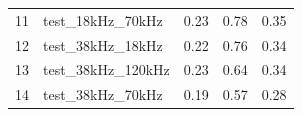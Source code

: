\begin{longtable}{lllll}
11                     & test\_18kHz\_70kHz                          & 0.23                           & 0.78                        & 0.35                           \\
12                     & test\_38kHz\_18kHz                          & 0.22                           & 0.76                        & 0.34                           \\
13                     & test\_38kHz\_120kHz                         & 0.23                           & 0.64                        & 0.34                           \\
14                     & test\_38kHz\_70kHz                          & 0.19                           & 0.57                        & 0.28                           \\ \hline
\end{longtable}

